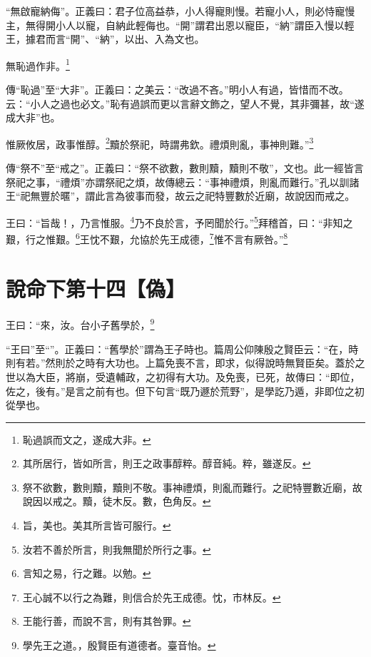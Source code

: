 {\noindent\shu{}\fzkt “無啟寵納侮”。正義曰：君子位高益恭，小人得寵則慢。若寵小人，則必恃寵慢主，無得開小人以寵，自納此輕侮也。“開”謂君出恩以寵臣，“納”謂臣入慢以輕王，據君而言“開”、“納”，以出、入為文也。 \par}

無恥過作非。\footnote{恥過誤而文之，遂成大非。}

{\noindent\zhuan{}\fzbyks 傳“恥過”至“大非”。正義曰：之美云：“改過不吝。”明小人有過，皆惜而不改。云：“小人之過也必文。”恥有過誤而更以言辭文飾之，望人不覺，其非彌甚，故“遂成大非”也。 \par}

惟厥攸居，政事惟醇。\footnote{其所居行，皆如所言，則王之政事醇粹。醇音純。粹，雖遂反。}黷於祭祀，時謂弗欽。禮煩則亂，事神則難。”\footnote{祭不欲數，數則黷，黷則不敬。事神禮煩，則亂而難行。之祀特豐數近廟，故說因以戒之。黷，徒木反。數，色角反。}

{\noindent\zhuan{}\fzbyks 傳“祭不”至“戒之”。正義曰：“祭不欲數，數則黷，黷則不敬”，文也。此一經皆言祭祀之事，“禮煩”亦謂祭祀之煩，故傳總云：“事神禮煩，則亂而難行。”孔以訓諸王“祀無豐於暱”，謂此言為彼事而發，故云之祀特豐數於近廟，故說因而戒之。 \par}

王曰：“旨哉！，乃言惟服。\footnote{旨，美也。美其所言皆可服行。}乃不良於言，予罔聞於行。”\footnote{汝若不善於所言，則我無聞於所行之事。}拜稽首，曰：“非知之艱，行之惟艱。\footnote{言知之易，行之難。以勉。}王忱不艱，允協於先王成德，\footnote{王心誠不以行之為難，則信合於先王成德。忱，市林反。}惟不言有厥咎。”\footnote{王能行善，而說不言，則有其咎罪。}

\section{說命下第十四【偽】}

王曰：“來，汝。台小子舊學於，\footnote{學先王之道。，殷賢臣有道德者。臺音怡。}

{\noindent\shu{}\fzkt “王曰”至“”。正義曰：“舊學於”謂為王子時也。篇周公仰陳殷之賢臣云：“在，時則有若。”然則於之時有大功也。上篇免喪不言，即求，似得說時無賢臣矣。蓋於之世以為大臣，將崩，受遺輔政，之初得有大功。及免喪，已死，故傳曰：“即位，佐之，後有。”是言之前有也。但下句言“既乃遯於荒野”，是學訖乃遁，非即位之初從學也。 \par}

